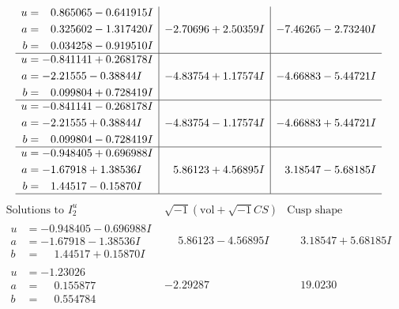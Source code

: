 \documentclass[1p]{elsarticle_modified}
\theoremstyle{definition}
\newcommand{\I}{\sqrt{-1}}
\begin{document}
$$\begin{array}{c|c|c}
\begin{aligned}
u &= \phantom{-}0.865065 - 0.641915 I \\
a &= \phantom{-}0.325602 - 1.317420 I \\
b &= \phantom{-}0.034258 - 0.919510 I\end{aligned}
 & -2.70696 + 2.50359 I & -7.46265 - 2.73240 I \\ \hline\begin{aligned}
u &= -0.841141 + 0.268178 I \\
a &= -2.21555 - 0.38844 I \\
b &= \phantom{-}0.099804 + 0.728419 I\end{aligned}
 & -4.83754 + 1.17574 I & -4.66883 - 5.44721 I \\ \hline\begin{aligned}
u &= -0.841141 - 0.268178 I \\
a &= -2.21555 + 0.38844 I \\
b &= \phantom{-}0.099804 - 0.728419 I\end{aligned}
 & -4.83754 - 1.17574 I & -4.66883 + 5.44721 I \\ \hline\begin{aligned}
u &= -0.948405 + 0.696988 I \\
a &= -1.67918 + 1.38536 I \\
b &= \phantom{-}1.44517 - 0.15870 I\end{aligned}
 & \phantom{-}5.86123 + 4.56895 I & \phantom{-}3.18547 - 5.68185 I\\
 \hline 
 \end{array}$$\newpage$$\begin{array}{c|c|c}  
\text{Solutions to }I^u_{2}& \I (\text{vol} + \sqrt{-1}CS) & \text{Cusp shape}\\
 \hline 
\begin{aligned}
u &= -0.948405 - 0.696988 I \\
a &= -1.67918 - 1.38536 I \\
b &= \phantom{-}1.44517 + 0.15870 I\end{aligned}
 & \phantom{-}5.86123 - 4.56895 I & \phantom{-}3.18547 + 5.68185 I \\ \hline\begin{aligned}
u &= -1.23026\phantom{ +0.000000I} \\
a &= \phantom{-}0.155877\phantom{ +0.000000I} \\
b &= \phantom{-}0.554784\phantom{ +0.000000I}\end{aligned}
 & -2.29287\phantom{ +0.000000I} & \phantom{-}19.0230\phantom{ +0.000000I} \\ \hline\begin{aligned}

\end{aligned}
\end{array}$$
\end{document}
